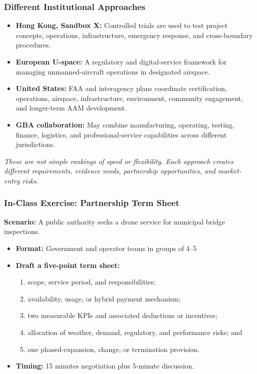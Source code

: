 \documentclass{beamer}
\begin{document}
\begin{frame}[t]
\frametitle{Different Institutional Approaches}
\begin{itemize}
\item \textbf{Hong Kong, Sandbox X:} Controlled trials are used to test project concepts, operations, infrastructure, emergency response, and cross-boundary procedures.
\item \textbf{European U-space:} A regulatory and digital-service framework for managing unmanned-aircraft operations in designated airspace.
\item \textbf{United States:} FAA and interagency plans coordinate certification, operations, airspace, infrastructure, environment, community engagement, and longer-term AAM development.
\item \textbf{GBA collaboration:} May combine manufacturing, operating, testing, finance, logistics, and professional-service capabilities across different jurisdictions.
\end{itemize}
\textit{These are not simple rankings of speed or flexibility. Each approach creates different requirements, evidence needs, partnership opportunities, and market-entry risks.}
\end{frame}

\begin{frame}[t]
\frametitle{In-Class Exercise: Partnership Term Sheet}
\textbf{Scenario:} A public authority seeks a drone service for municipal bridge inspections.
\begin{itemize}
\item \textbf{Format:} Government and operator teams in groups of 4--5
\item \textbf{Draft a five-point term sheet:}
\begin{enumerate}
\item scope, service period, and responsibilities;
\item availability, usage, or hybrid payment mechanism;
\item two measurable KPIs and associated deductions or incentives;
\item allocation of weather, demand, regulatory, and performance risks; and
\item one phased-expansion, change, or termination provision.
\end{enumerate}
\item \textbf{Timing:} 15 minutes negotiation plus 5-minute discussion.
\end{itemize}
\end{frame}
\end{document}
